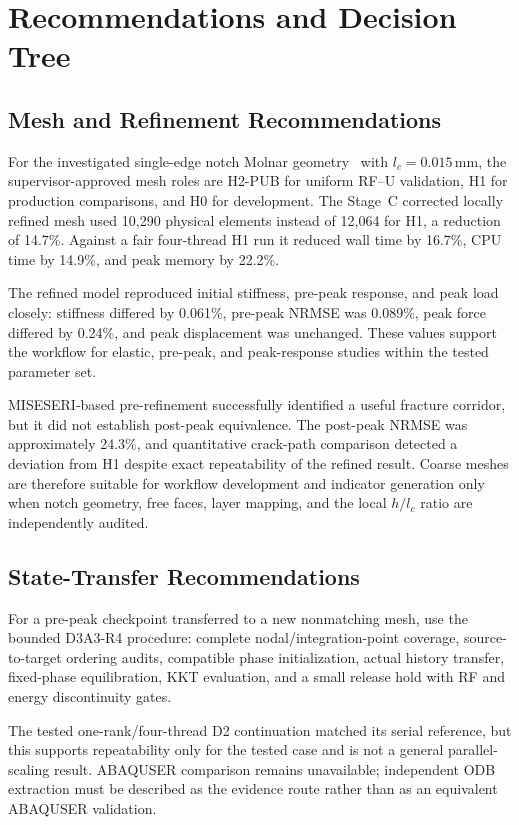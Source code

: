 \chapter{Recommendations and Decision Tree}
\label{chap:final-recommendations}

\section{Mesh and Refinement Recommendations}

For the investigated single-edge notch Molnar geometry~\cite{molnar2017} with
\(l_c=0.015\,\mathrm{mm}\), the supervisor-approved mesh roles are H2-PUB for
uniform RF--U validation, H1 for production comparisons, and H0 for
development. The Stage~C corrected
locally refined mesh used 10,290 physical elements instead of 12,064 for H1,
a reduction of 14.7\%. Against a fair four-thread H1 run it reduced wall time
by 16.7\%, CPU time by 14.9\%, and peak memory by 22.2\%.

The refined model reproduced initial stiffness, pre-peak response, and peak
load closely: stiffness differed by 0.061\%, pre-peak NRMSE was 0.089\%, peak
force differed by 0.24\%, and peak displacement was unchanged. These values
support the workflow for elastic, pre-peak, and peak-response studies within
the tested parameter set.

MISESERI-based pre-refinement successfully identified a useful fracture
corridor, but it did not establish post-peak equivalence. The post-peak NRMSE
was approximately 24.3\%, and quantitative crack-path comparison detected a
deviation from H1 despite exact repeatability of the refined result. Coarse
meshes are therefore suitable for workflow development and indicator
generation only when notch geometry, free faces, layer mapping, and the local
\(h/l_c\) ratio are independently audited.

\section{State-Transfer Recommendations}

For a pre-peak checkpoint transferred to a new nonmatching mesh, use the
bounded D3A3-R4 procedure: complete nodal/integration-point coverage,
source-to-target ordering audits, compatible phase initialization, actual
history transfer, fixed-phase equilibration, KKT evaluation, and a small
release hold with RF and energy discontinuity gates.

The tested one-rank/four-thread D2 continuation matched its serial reference,
but this supports repeatability only for the tested case and is not a general
parallel-scaling result. ABAQUSER comparison remains unavailable; independent
ODB extraction must be described as the evidence route rather than as an
equivalent ABAQUSER validation.

